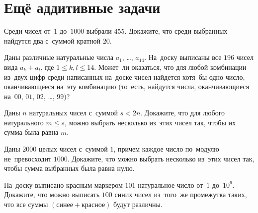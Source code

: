 
\section*{Ещё аддитивные задачи}


\begin{problems}

\item
Среди чисел от~$1$ до~$1000$ выбрали $455$.
Докажите, что среди выбранных найдутся два с~суммой кратной $20$.

\item
Даны различные натуральные числа $a_{1}$, \ldots, $a_{14}$.
На~доску выписаны все $196$ чисел вида $a_{k} + a_{l}$, где
$1 \leq k, l \leq 14$.
Может~ли оказаться, что для любой комбинации из~двух цифр среди написанных
на~доске чисел найдется хотя~бы одно число, оканчивающееся на~эту комбинацию
(то~есть, найдутся числа, оканчивающиеся на~$00$, $01$, $02$, \ldots, $99$)?

\item
Даны $n$ натуральных чисел с~суммой $s < 2 n$.
Докажите, что для любого натурального $m \leq s$, можно выбрать несколько
из~этих чисел так, чтобы их сумма была равна $m$.

\item
Даны $2000$ целых чисел с~суммой $1$, причем каждое число по~модулю
не~превосходит $1000$.
Докажите, что можно выбрать несколько из~этих чисел так, чтобы сумма выбранных
была равна нулю.

\item
На~доску выписано красным маркером $101$ натуральное число от~$1$ до~$10^{6}$.
Докажите, что можно выписать $100$ синих чисел из~того~же промежутка таких, что
все суммы $(\text{синее} + \text{красное})$ будут различны.

\end{problems}

